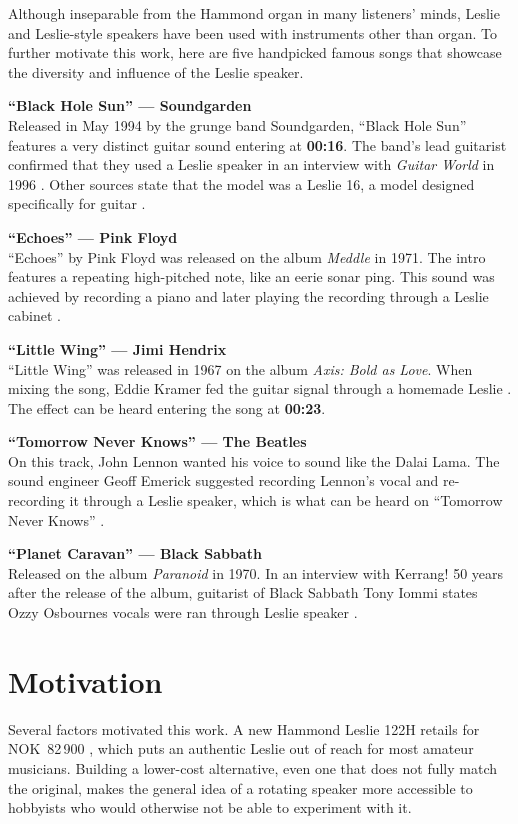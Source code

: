 Although inseparable from the Hammond organ in many listeners' minds, Leslie and Leslie-style speakers have been used with instruments other than organ. To further motivate this work, here are five handpicked famous songs that showcase the diversity and influence of the Leslie speaker.

\textbf{``Black Hole Sun'' --- Soundgarden}\\
Released in May 1994 by the grunge band Soundgarden, ``Black Hole Sun'' features a very distinct guitar sound entering at \textbf{00:16}. The band's lead guitarist confirmed that they used a Leslie speaker in an interview with \textit{Guitar World} in 1996 \citep{KittsTolinskiSteinblatt1998NirvanaGrungeRevolution}. Other sources state that the model was a Leslie 16, a model designed specifically for guitar \citep{Gill2019CornellToneBlackHoleSun}.

\textbf{``Echoes'' --- Pink Floyd}\\
``Echoes'' by Pink Floyd was released on the album \textit{Meddle} in 1971. The intro features a repeating high-pitched note, like an eerie sonar ping. This sound was achieved by recording a piano and later playing the recording through a Leslie cabinet \citep{Povey2007PigsMightFly}.

\textbf{``Little Wing'' --- Jimi Hendrix}\\
``Little Wing'' was released in 1967 on the album \textit{Axis: Bold as Love}. When mixing the song, Eddie Kramer fed the guitar signal through a homemade Leslie \citep{McDermottKramerCox2009UltimateHendrix}. The effect can be heard entering the song at \textbf{00:23}.

\textbf{``Tomorrow Never Knows'' --- The Beatles}\\
On this track, John Lennon wanted his voice to sound like the Dalai Lama. The sound engineer Geoff Emerick suggested recording Lennon's vocal and re-recording it through a Leslie speaker, which is what can be heard on ``Tomorrow Never Knows'' \citep{Beatles2000Anthology}.

\textbf{``Planet Caravan'' --- Black Sabbath}\\
Released on the album \textit{Paranoid} in 1970. In an interview with Kerrang! 50 years after the release of the album, guitarist of Black Sabbath Tony Iommi states Ozzy Osbournes vocals were ran through Leslie speaker \citep{alexander2020paranoid}.

\section{Motivation}
Several factors motivated this work. A new Hammond Leslie 122H retails for NOK~82\,900 \citep{thomann_leslie122h}, which puts an authentic Leslie out of reach for most amateur musicians. Building a lower-cost alternative, even one that does not fully match the original, makes the general idea of a rotating speaker more accessible to hobbyists who would otherwise not be able to experiment with it.

